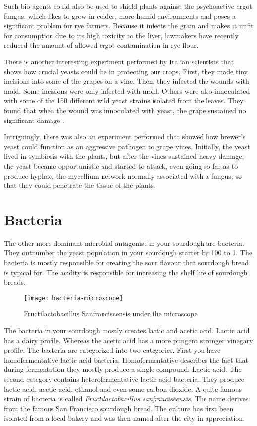 Such bio-agents could also be used to shield plants against the psychoactive
ergot fungus, which likes to grow in colder, more humid environments and
poses a significant problem for rye farmers. Because it infects the grain
and makes it unfit for consumption due to its high toxicity to the liver,
lawmakers have recently reduced the amount of allowed ergot contamination in
rye flour.

There is another interesting experiment performed by Italian scientists that
shows how crucial yeasts could be in protecting our crops. First, they made
tiny incisions into some of the grapes on a vine. Then, they infected the
wounds with mold. Some incisions were only infected with mold. Others were also
innoculated with some of the 150 different wild yeast strains isolated from the
leaves. They found that when the wound was innoculated with yeast, the grape
sustained no significant damage \cite{yeasts+biocontrol+agent}.

Intriguingly, there was also an experiment performed that showed how brewer's
yeast could function as an aggressive pathogen to grape vines. Initially, the
yeast lived in symbiosis with the plants, but after the vines sustained heavy
damage, the yeast became opportunistic and started to attack, even going so far
as to produce hyphae, the mycellium network normally associated with a fungus,
so that they could penetrate the tissue of the plants.

\section{Bacteria}

The other more dominant microbial antagonist in your sourdough
are bacteria. They outnumber the yeast population in your sourdough
starter by 100 to 1. The bacteria is mostly responsible for creating
the sour flavour that sourdough bread is typical for. The acidity
is responsible for increasing the shelf life of sourdough breads.
\cite{shelflife+acidity}

\begin{figure}
  \texttt{[image: bacteria-microscope]}
  \caption{Fructilactobacillus Sanfranciscensis under the microscope}
  \label{lactobacillus-franciscensis-microscope}
\end{figure}

The bacteria in your sourdough mostly creates lactic and acetic acid. Lactic acid
has a dairy profile. Whereas the acetic acid has a more pungent
stronger vinegary profile. The bacteria are categorized into
two categories. First you have homofermentative lactic acid bacteria.
Homofermentative describes the fact that during fermentation
they mostly produce a single compound: Lactic acid. The second
category contains heterofermentative lactic acid bacteria. They
produce lactic acid, acetic acid, ethanol and even some carbon
dioxide. A quite famous strain of bacteria is called
\emph{Fructilactobacillus sanfranciscensis}. The name derives
from the famous San Francisco sourdough bread. The culture has
first been isolated from a local bakery and was then named
after the city in appreciation.

